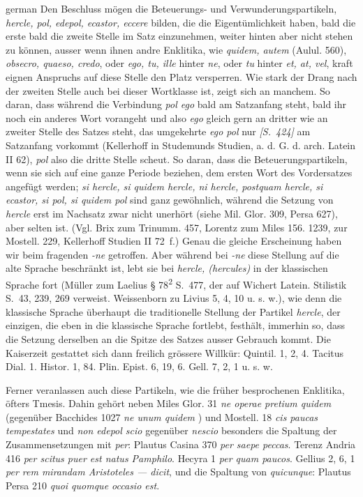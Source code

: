 \begin{otherlanguage*}{german}
Den Beschluss mögen die Beteuerungs- und Verwunderungspartikeln, \emph{hercle, pol, edepol, ecastor, eccere} bilden, die die Eigentümlichkeit haben, bald die erste bald die zweite Stelle im Satz einzunehmen, weiter hinten aber nicht stehen zu können, ausser wenn ihnen andre Enklitika, wie \emph{quidem, autem} (Aulul. 560), \emph{obsecro, quaeso, credo}, oder \emph{ego, tu, ille} hinter \emph{ne}, oder \emph{tu} hinter \emph{et, at, vel}, kraft eignen Anspruchs auf diese Stelle den Platz versperren. Wie stark der Drang nach der zweiten Stelle auch bei dieser Wortklasse ist, zeigt sich an manchem. So daran, dass während die Verbindung \emph{pol ego} bald am Satzanfang steht, bald ihr noch ein anderes Wort vorangeht und also \emph{ego} gleich gern an dritter wie an zweiter Stelle des Satzes steht, das umgekehrte \emph{ego pol} nur \hypertarget{p424}{\emph{[S.~424]}}\label{p424} am Satzanfang vorkommt (Kellerhoff in Studemunds Studien, a. d. G. d. arch. Latein II 62), \emph{pol} also die dritte Stelle scheut. So daran, dass die Beteuerungspartikeln, wenn sie sich auf eine ganze Periode beziehen, dem ersten Wort des Vordersatzes angefügt werden; \emph{si hercle, si quidem hercle, ni hercle, postquam hercle, si ecastor, si pol, si quidem pol} sind ganz gewöhnlich, während die Setzung von \emph{hercle} erst im Nachsatz zwar nicht unerhört (siehe Mil. Glor. 309, Persa 627), aber selten ist. (Vgl. Brix zum Trinumm. 457, Lorentz zum Miles 156. 1239, zur Mostell. 229, Kellerhoff Studien II 72~f.) Genau die gleiche Erscheinung haben wir beim fragenden \emph{-ne} getroffen. Aber während bei \emph{-ne} diese Stellung auf die alte Sprache beschränkt ist, lebt sie bei \emph{hercle, (hercules)} in der klassischen Sprache fort (Müller zum Laelius § 78\textsuperscript{2} S.~477, der auf Wichert Latein. Stilistik S.~43, 239, 269 verweist. Weissenborn zu Livius 5, 4, 10 u. s. w.), wie denn die klassische Sprache überhaupt die traditionelle Stellung der Partikel \emph{hercle}, der einzigen, die eben in die klassische Sprache fortlebt, festhält, immerhin so, dass die Setzung derselben an die Spitze des Satzes ausser Gebrauch kommt. Die Kaiserzeit gestattet sich dann freilich grössere Willkür: Quintil. 1, 2, 4. Tacitus Dial. 1. Histor. 1, 84. Plin. Epist. 6, 19, 6. Gell. 7, 2, 1 u. s. w.

Ferner veranlassen auch diese Partikeln, wie die früher besprochenen Enklitika, öfters Tmesis. Dahin gehört neben Miles Glor. 31 \emph{ne  operae pretium quidem} (gegenüber Bacchides 1027 \emph{ne unum quidem }) und Mostell. 18 \emph{cis  paucas tempestates} und \emph{non edepol scio} gegenüber \emph{nescio} besonders die Spaltung der Zusammensetzungen mit \emph{per}: Plautus Casina 370 \emph{per  saepe peccas}. Terenz Andria 416 \emph{per  scitus puer est natus Pamphilo}. Hecyra 1 \emph{per  quam paucos}. Gellius 2, 6, 1 \emph{per  rem mirandam Aristoteles — dicit}, und die Spaltung von \emph{quicunque}: Plautus Persa 210 \emph{quoi  quomque occasio est}.


\end{otherlanguage*}
